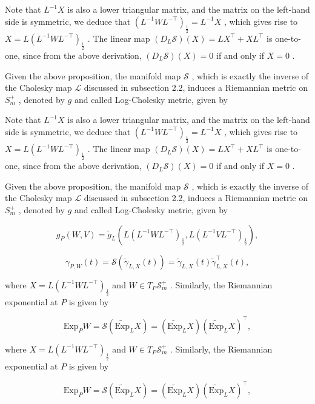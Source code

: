 \documentclass[11pt]{article}
\begin{document}
Note that  $L^{-1}X$  is also a lower triangular matrix, and the matrix on the left-hand side is symmetric, we deduce that  $(L^{-1}WL^{-\top})_{\frac{1}{2}} = L^{-1}X$ , which gives rise to  $X = L(L^{-1}WL^{-\top})_{\frac{1}{2}}$ . The linear map  $(D_L\mathcal{S})(X) = LX^\top +XL^\top$  is one-to-one, since from the above derivation,  $(D_L\mathcal{S})(X) = 0$  if and only if  $X = 0$ .

Given the above proposition, the manifold map  $\mathcal{S}$ , which is exactly the inverse of the Cholesky map  $\mathcal{L}$  discussed in subsection 2.2, induces a Riemannian metric on  $S_{m}^{+}$ , denoted by  $g$  and called Log-Cholesky metric, given by

Note that  $L^{-1}X$  is also a lower triangular matrix, and the matrix on the left-hand side is symmetric, we deduce that  $(L^{-1}WL^{-\top})_{\frac{1}{2}} = L^{-1}X$ , which gives rise to  $X = L(L^{-1}WL^{-\top})_{\frac{1}{2}}$ . The linear map  $(D_L\mathcal{S})(X) = LX^\top +XL^\top$  is one-to-one, since from the above derivation,  $(D_L\mathcal{S})(X) = 0$  if and only if  $X = 0$ .

Given the above proposition, the manifold map  $\mathcal{S}$ , which is exactly the inverse of the Cholesky map  $\mathcal{L}$  discussed in subsection 2.2, induces a Riemannian metric on  $S_{m}^{+}$ , denoted by  $g$  and called Log-Cholesky metric, given by

$$
g _ {P} (W, V) = \tilde {g} _ {L} \left(L \left(L ^ {- 1} W L ^ {- \top}\right) _ {\frac {1}{2}}, L \left(L ^ {- 1} V L ^ {- \top}\right) _ {\frac {1}{2}}\right), \tag {3.1}
$$

$$
\gamma_ {P, W} (t) = \mathcal {S} (\tilde {\gamma} _ {L, X} (t)) = \tilde {\gamma} _ {L, X} (t) \tilde {\gamma} _ {L, X} ^ {\top} (t),
$$

where  $X = L(L^{-1}WL^{-\top})_{\frac{1}{2}}$  and  $W \in T_P\mathcal{S}_m^+$ . Similarly, the Riemannian exponential at  $P$  is given by

$$
\mathrm {E x p} _ {P} W = \mathcal {S} (\widetilde {\mathrm {E x p}} _ {L} X) = (\widetilde {\mathrm {E x p}} _ {L} X) (\widetilde {\mathrm {E x p}} _ {L} X) ^ {\top},
$$

where  $X = L(L^{-1}WL^{-\top})_{\frac{1}{2}}$  and  $W \in T_P\mathcal{S}_m^+$ . Similarly, the Riemannian exponential at  $P$  is given by

$$
\mathrm {E x p} _ {P} W = \mathcal {S} (\widetilde {\mathrm {E x p}} _ {L} X) = (\widetilde {\mathrm {E x p}} _ {L} X) (\widetilde {\mathrm {E x p}} _ {L} X) ^ {\top},
$$
\end{document}
